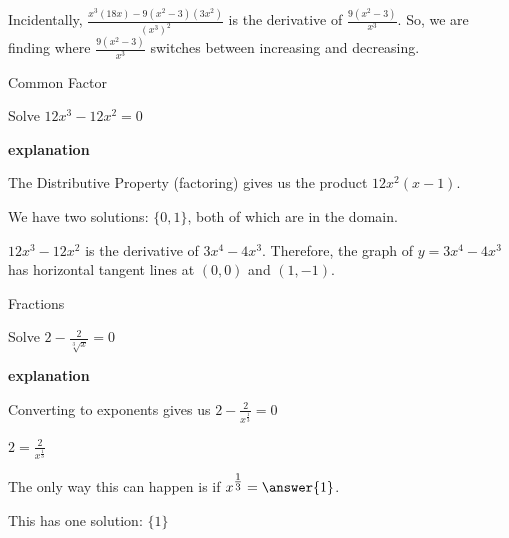 \documentclass{ximera}
\begin{document}
Incidentally, $\frac{x^3 (18x) - 9(x^2-3)(3x^2)}{(x^3)^2}$ is the derivative of $\frac{9(x^2-3)}{x^3}$.  So, we are finding where $\frac{9(x^2-3)}{x^3}$ switches between increasing and decreasing.











\begin{example}  Common Factor


Solve $12 x^3 - 12 x^2 = 0 $



\textbf{\textcolor{red!75!green}{explanation}} 


The Distributive Property (factoring) gives us the product $12 x^2 (x-1)$.




We have two solutions: $\{ 0, 1  \}$, both of which are in the domain.




$12 x^3 - 12 x^2$ is the derivative of $3x^4 - 4x^3$.  Therefore, the graph of $y = 3x^4 - 4x^3$ has horizontal tangent lines at $(0, 0)$ and $(1, -1)$.





\begin{center}
\end{center}


\end{example}





















\begin{example}  Fractions


Solve $2 - \frac{2}{\sqrt[3]{x}} = 0$



\textbf{\textcolor{red!75!green}{explanation}} 


Converting to exponents gives us $2 - \frac{2}{x^{\tfrac{1}{3}}} = 0$


$2 = \frac{2}{x^{\tfrac{1}{3}}}$

The only way this can happen is if $x^{\tfrac{1}{3}} = \answer{1}$.

This has one solution: $\{  1  \}$








\end{example}
\end{document}

